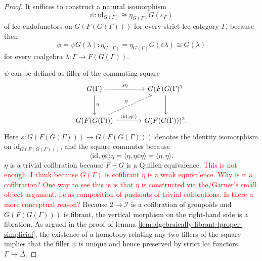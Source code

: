 \documentclass{article}
\newcommand{\todo}[1]{\textcolor{red}{#1}}
\theoremstyle{remark}
\theoremstyle{definition}
\begin{document}
\begin{proof}
  It suffices to construct a natural isomorphism
  \begin{equation}
    \psi : \mathrm{id}_{G(\Gamma)} \cong \eta_{G(\Gamma)} G(\varepsilon_\Gamma)
  \end{equation}
  of lcc endofunctors on $G(F(G(\Gamma)))$ for every strict lcc category $\Gamma$, because then
  \begin{equation}
    \phi = \psi G(\lambda) : \eta_{G(\Gamma)} = \eta_{G(\Gamma)} G(\varepsilon \lambda) \cong G(\lambda)
  \end{equation}
  for every coalgebra $\lambda : \Gamma \rightarrow F(G(\Gamma))$.

  $\psi$ can be defined as filler of the commuting square
  \begin{equation}
    \begin{tikzcd}[column sep=large, row sep=large]
      G(\Gamma) \arrow[d, "\eta"] \arrow[r, "s \eta"] & G(F(G(\Gamma)^\mathcal{I} \arrow[d] \\
      G(F(G(\Gamma))) \arrow[r, "{\langle \mathrm{id}, \eta \varepsilon \rangle}"] \arrow[ur, dashed, "\psi"] & G(F(G(\Gamma)))^2.
    \end{tikzcd}
  \end{equation}
  Here $s : G(F(G(\Gamma))) \rightarrow G(F(G(\Gamma)))$ denotes the identity isomorphism on $\mathrm{id}_{G(F(G(\Gamma)))}$, and the square commutes because
  \begin{equation}
    \langle \mathrm{id}, \eta \varepsilon \rangle \eta = \langle \eta, \eta \varepsilon \eta \rangle = \langle \eta, \eta \rangle.
  \end{equation}
  $\eta$ is a trivial cofibration because $F \dashv G$ is a Quillen equivalence.
  \todo{
    This is not enough.
    I think because $G(\Gamma)$ is cofibrant $\eta$ is a weak equivalence.
    Why is it a cofibration?
    One way to see this is is that $\eta$ is constructed via the/Garner's small object argument, i.e.\@ as composition of pushouts of trivial cofibrations.
    Is there a more conceptual reason?
  }
  Because $2 \rightarrow \mathcal{I}$ is a cofibration of groupoids and $G(F(G(\Gamma)))$ is fibrant, the vertical morphism on the right-hand side is a fibration.
  As argued in the proof of lemma \ref{lem:algebraically-fibrant-lproper-simplicial}, the existence of a homotopy relating any two fillers of the square implies that the filler $\psi$ is unique and hence preserved by strict lcc functors $\Gamma \rightarrow \Delta$.
\end{proof}
\end{document}
